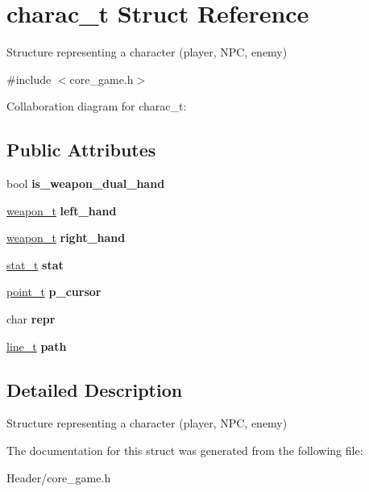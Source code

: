 \hypertarget{structcharac__t}{}\section{charac\+\_\+t Struct Reference}
\label{structcharac__t}


Structure representing a character (player, N\+PC, enemy)  




{\ttfamily \#include $<$core\+\_\+game.\+h$>$}



Collaboration diagram for charac\+\_\+t\+:
\subsection*{Public Attributes}
\begin{DoxyCompactItemize}
\item 
\mbox{\label{structcharac__t_a4f32c6d26c792fa24f870ee4531db216}} 
bool {\bfseries is\+\_\+weapon\+\_\+dual\+\_\+hand}
\item 
\mbox{\label{structcharac__t_a670b65df88c5d8f29d7529f7d32f91e2}} 
\hyperlink{structweapon__t}{weapon\+\_\+t} {\bfseries left\+\_\+hand}
\item 
\mbox{\label{structcharac__t_a904019cd04e25eb607f018adf3b53f53}} 
\hyperlink{structweapon__t}{weapon\+\_\+t} {\bfseries right\+\_\+hand}
\item 
\mbox{\label{structcharac__t_aee77e9f65ecc79e2ea84d252756be09c}} 
\hyperlink{structstat__t}{stat\+\_\+t} {\bfseries stat}
\item 
\mbox{\label{structcharac__t_a2a85c23151a3f1591d4a56be93a4d86b}} 
\hyperlink{structpoint__t}{point\+\_\+t} {\bfseries p\+\_\+cursor}
\item 
\mbox{\label{structcharac__t_a8cb9f1c7c78b3397ace9d4c561ebdb07}} 
char {\bfseries repr}
\item 
\mbox{\label{structcharac__t_ab5ab756b7c97b1ba73031613270d9f03}} 
\hyperlink{structline__t}{line\+\_\+t} {\bfseries path}
\end{DoxyCompactItemize}


\subsection{Detailed Description}
Structure representing a character (player, N\+PC, enemy) 

The documentation for this struct was generated from the following file\+:\begin{DoxyCompactItemize}
\item 
Header/core\+\_\+game.\+h\end{DoxyCompactItemize}
